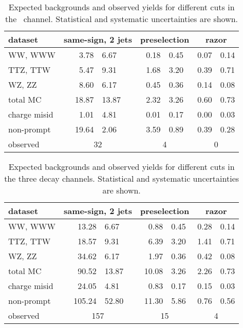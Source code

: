         \begin{table}[htb]
            \centering
            \begin{tabular}{l *3{r@{$\pm$}l}}
                
\toprule
dataset & \multicolumn{2}{c}{same-sign, 2 jets}& \multicolumn{2}{c}{preselection}& \multicolumn{2}{c}{razor} \\
\midrule
WW, WWW& 3.78 & 6.67& 0.18 & 0.45& 0.07 & 0.14\\
TTZ, TTW& 5.47 & 9.31& 1.68 & 3.20& 0.39 & 0.71\\
WZ, ZZ& 8.60 & 6.17& 0.45 & 0.36& 0.14 & 0.08\\
\midrule
total MC& 18.87 & 13.87& 2.32 & 3.26& 0.60 & 0.73\\
charge misid& 1.01 & 4.81& 0.01 & 0.17& 0.00 & 0.03\\
non-prompt & 19.64 & 2.06& 3.59 & 0.89& 0.39 & 0.28\\
observed & \multicolumn{2}{c}{32}& \multicolumn{2}{c}{4}& \multicolumn{2}{c}{0} \\
\bottomrule

            \end{tabular}
            \caption{Expected backgrounds and observed yields for different
            cuts in the \M\M\ channel. Statistical and systematic uncertainties are
            shown.}
            \label{tab:background_yields}
        \end{table}

        \begin{table}[htb]
            \centering
            \begin{tabular}{l *3{r@{$\pm$}l}}
                
\toprule
dataset & \multicolumn{2}{c}{same-sign, 2 jets}& \multicolumn{2}{c}{preselection}& \multicolumn{2}{c}{razor} \\
\midrule
WW, WWW& 13.28 & 6.67& 0.88 & 0.45& 0.28 & 0.14\\
TTZ, TTW& 18.57 & 9.31& 6.39 & 3.20& 1.41 & 0.71\\
WZ, ZZ& 34.62 & 6.17& 1.97 & 0.36& 0.42 & 0.08\\
\midrule
total MC& 90.52 & 13.87& 10.08 & 3.26& 2.26 & 0.73\\
charge misid& 24.05 & 4.81& 0.83 & 0.17& 0.15 & 0.03\\
non-prompt & 105.24 & 52.80& 11.30 & 5.86& 0.76 & 0.56\\
observed & \multicolumn{2}{c}{157}& \multicolumn{2}{c}{15}& \multicolumn{2}{c}{4} \\
\bottomrule

            \end{tabular}
            \caption{Expected backgrounds and observed yields for different
            cuts in the three decay channels. Statistical and systematic uncertainties are
            shown.}
            \label{tab:background_yields}
        \end{table}
